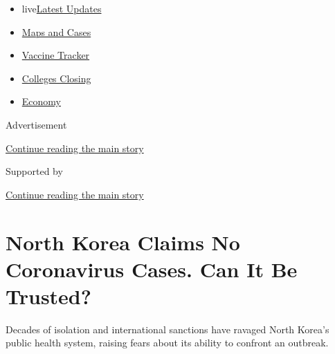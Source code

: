 \begin{itemize}
\tightlist
\item
  live\href{https://www.nytimes3xbfgragh.onion/2020/08/21/world/covid-19-coronavirus.html?name=styln-coronavirus-national\&region=TOP_BANNER\&variant=undefined\&block=storyline_menu_recirc\&action=click\&pgtype=Article\&impression_id=dc64b7e1-e392-11ea-b9d4-1fe3e0583a82}{Latest
  Updates}
\item
  \href{https://www.nytimes3xbfgragh.onion/interactive/2020/us/coronavirus-us-cases.html?name=styln-coronavirus-national\&region=TOP_BANNER\&variant=undefined\&block=storyline_menu_recirc\&action=click\&pgtype=Article\&impression_id=dc64b7e2-e392-11ea-b9d4-1fe3e0583a82}{Maps
  and Cases}
\item
  \href{https://www.nytimes3xbfgragh.onion/interactive/2020/science/coronavirus-vaccine-tracker.html?name=styln-coronavirus-national\&region=TOP_BANNER\&variant=undefined\&block=storyline_menu_recirc\&action=click\&pgtype=Article\&impression_id=dc64def0-e392-11ea-b9d4-1fe3e0583a82}{Vaccine
  Tracker}
\item
  \href{https://www.nytimes3xbfgragh.onion/2020/08/19/us/colleges-closing-covid.html?name=styln-coronavirus-national\&region=TOP_BANNER\&variant=undefined\&block=storyline_menu_recirc\&action=click\&pgtype=Article\&impression_id=dc64def1-e392-11ea-b9d4-1fe3e0583a82}{Colleges
  Closing}
\item
  \href{https://www.nytimes3xbfgragh.onion/live/2020/08/20/business/stock-market-today-coronavirus?name=styln-coronavirus-national\&region=TOP_BANNER\&variant=undefined\&block=storyline_menu_recirc\&action=click\&pgtype=Article\&impression_id=dc64def2-e392-11ea-b9d4-1fe3e0583a82}{Economy}
\end{itemize}

Advertisement

\protect\hyperlink{after-top}{Continue reading the main story}

Supported by

\protect\hyperlink{after-sponsor}{Continue reading the main story}

\hypertarget{north-korea-claims-no-coronavirus-cases-can-it-be-trusted}{%
\section{North Korea Claims No Coronavirus Cases. Can It Be
Trusted?}\label{north-korea-claims-no-coronavirus-cases-can-it-be-trusted}}

Decades of isolation and international sanctions have ravaged North
Korea's public health system, raising fears about its ability to
confront an outbreak.

